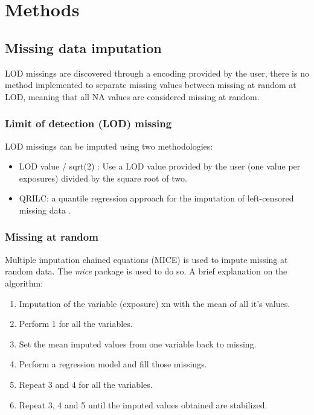 \documentclass[
]{book}
\providecommand{\tightlist}{%
  \setlength{\itemsep}{0pt}\setlength{\parskip}{0pt}}
\begin{document}
\hypertarget{methods}{%
\chapter{Methods}\label{methods}}

\hypertarget{missing-data-imputation}{%
\section{Missing data imputation}\label{missing-data-imputation}}

LOD missings are discovered through a encoding provided by the user, there is no method implemented to separate missing values between missing at random at LOD, meaning that all NA values are considered missing at random.

\hypertarget{limit-of-detection-lod-missing}{%
\subsection{Limit of detection (LOD) missing}\label{limit-of-detection-lod-missing}}

LOD missings can be imputed using two methodologies:

\begin{itemize}
\tightlist
\item
  LOD value / sqrt(2) : Use a LOD value provided by the user (one value per exposures) divided by the square root of two. \citet{Richardson2003}
\item
  QRILC: a quantile regression approach for the imputation of left-censored missing data \citet{lod_impute}.
\end{itemize}

\hypertarget{missing-at-random}{%
\subsection{Missing at random}\label{missing-at-random}}

Multiple imputation chained equations (MICE) is used to impute missing at random data. The \emph{mice} package is used to do so. A brief explanation on the algorithm:

\begin{enumerate}
\def\labelenumi{\arabic{enumi}.}
\tightlist
\item
  Imputation of the variable (exposure) xn with the mean of all it's values.
\item
  Perform 1 for all the variables.
\item
  Set the mean imputed values from one variable back to missing.
\item
  Perform a regression model and fill those missings.
\item
  Repeat 3 and 4 for all the variables.
\item
  Repeat 3, 4 and 5 until the imputed values obtained are stabilized.
\end{enumerate}
\end{document}
